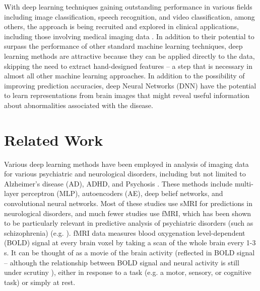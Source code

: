 \documentclass{article}
\begin{document}
With deep learning techniques gaining outstanding performance in various fields including image classification, speech recognition, and video classification, among others, the approach is being recruited and explored in clinical applications, including those involving medical imaging data \citep{Shen2017, Litjens2017, Gulshan2016}. In addition to their potential to surpass the performance of other standard machine learning techniques, deep learning  methods are attractive because they can be applied directly to the data, skipping the need to extract hand-designed features – a step that is necessary in almost all other machine learning approaches. In addition to the possibility of improving prediction accuracies, deep Neural Networks (DNN) have the potential to learn representations from brain images that might reveal useful information about abnormalities associated with the disease.

\section{Related Work}

Various deep learning methods have been employed in analysis of imaging data for various psychiatric and neurological disorders, including but not limited to Alzheimer’s disease (AD), ADHD, and Psychosis \citep[see][for a review]{Vieira2017}. These methods include multi-layer perceptron (MLP), autoencoders (AE), deep belief networks, and convolutional neural networks. Most of these studies use sMRI for predictions in neurological disorders, and much fewer studies use fMRI, which has been shown to be particularly relevant in predictive analysis of psychiatric disorders (such as schizophrenia) (e.g. \citep{Damaraju2014, Calhoun2009}). fMRI data measures blood oxygenation level-dependent (BOLD) signal at every brain voxel by taking a scan of the whole brain every 1-3 s. It can be thought of as a movie of the brain activity (reflected in BOLD signal – although the relationship between BOLD signal and neural activity is still under scrutiny \citep{RN1}), either in response to a task (e.g. a motor, sensory, or cognitive task) or simply at rest.
\end{document}
